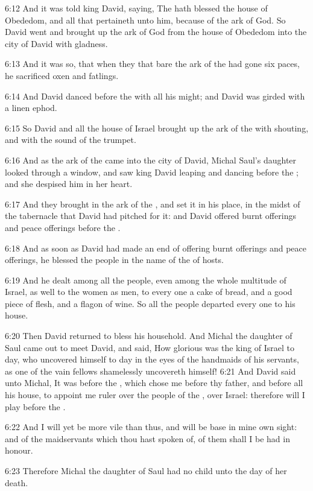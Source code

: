 6:12 And it was told king David, saying, The \LORD hath blessed the
house of Obededom, and all that pertaineth unto him, because of the
ark of God. So David went and brought up the ark of God from the house
of Obededom into the city of David with gladness.

6:13 And it was so, that when they that bare the ark of the \LORD had
gone six paces, he sacrificed oxen and fatlings.

6:14 And David danced before the \LORD with all his might; and David
was girded with a linen ephod.

6:15 So David and all the house of Israel brought up the ark of the
\LORD with shouting, and with the sound of the trumpet.

6:16 And as the ark of the \LORD came into the city of David, Michal
Saul's daughter looked through a window, and saw king David leaping
and dancing before the \LORD; and she despised him in her heart.

6:17 And they brought in the ark of the \LORD, and set it in his place,
in the midst of the tabernacle that David had pitched for it: and
David offered burnt offerings and peace offerings before the \LORD.

6:18 And as soon as David had made an end of offering burnt offerings
and peace offerings, he blessed the people in the name of the \LORD of
hosts.

6:19 And he dealt among all the people, even among the whole multitude
of Israel, as well to the women as men, to every one a cake of bread,
and a good piece of flesh, and a flagon of wine. So all the people
departed every one to his house.

6:20 Then David returned to bless his household. And Michal the
daughter of Saul came out to meet David, and said, How glorious was
the king of Israel to day, who uncovered himself to day in the eyes of
the handmaids of his servants, as one of the vain fellows shamelessly
uncovereth himself!  6:21 And David said unto Michal, It was before
the \LORD, which chose me before thy father, and before all his house,
to appoint me ruler over the people of the \LORD, over Israel:
therefore will I play before the \LORD.

6:22 And I will yet be more vile than thus, and will be base in mine
own sight: and of the maidservants which thou hast spoken of, of them
shall I be had in honour.

6:23 Therefore Michal the daughter of Saul had no child unto the day
of her death.

